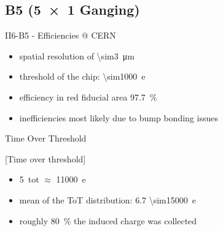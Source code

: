 \subsection{B5 (\SI{5x1}{} Ganging)}
\begin{frame}{II6-B5 - Efficiencies @ CERN}

	
	\begin{itemize}\itemfill
		\item spatial resolution of \SI{\sim3}{\micro\meter}
		\item threshold of the chip: \SI{\sim1000}{e}
		\item efficiency in red fiducial area \SI{97.7}{\%}
		\item inefficiencies most likely due to bump bonding issues
	\end{itemize}
	
\end{frame}
\begin{frame}{Time Over Threshold}

	[Time over threshold]	
	
	\begin{itemize}\itemfill
		\item \SI{5}{tot} $\approx$ \SI{11000}{e}
		\item mean of the ToT distribution: 6.7 \ra \SI{\sim15000}{e}
		\item roughly \SI{80}{\%} the induced charge was collected
	\end{itemize}
	
\end{frame}

